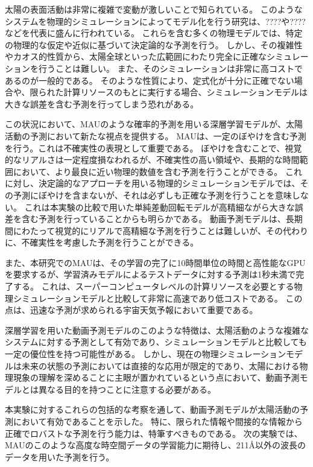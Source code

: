       太陽の表面活動は非常に複雑で変動が激しいことで知られている。
      このようなシステムを物理的シミュレーションによってモデル化を行う研究は、????や????などを代表に盛んに行われている。
      これらを含む多くの物理モデルでは、特定の物理的な仮定や近似に基づいて決定論的な予測を行う。
      しかし、その複雑性やカオス的性質から、太陽全球といった広範囲にわたり完全に正確なシミュレーションを行うことは難しい。
      また、そのシミュレーションは非常に高コストであるのが一般的である。
      そのような性質により、定式化が十分に正確でない場合や、限られた計算リソースのもとに実行する場合、シミュレーションモデルは大きな誤差を含む予測を行ってしまう恐れがある。

      この状況において、MAUのような確率的予測を用いる深層学習モデルが、太陽活動の予測において新たな視点を提供する。
      MAUは、一定のぼやけを含む予測を行う。これは不確実性の表現として重要である。
      ぼやけを含むことで、視覚的なリアルさは一定程度損なわれるが、不確実性の高い領域や、長期的な時間範囲において、より最良に近い物理的数値を含む予測を行うことができる。
      これに対し、決定論的なアプローチを用いる物理的シミュレーションモデルでは、その予測にぼやけを含まないが、それは必ずしも正確な予測を行うことを意味しない。
      これは本実験の比較で用いた単純差動回転モデルが高精細ながら大きな誤差を含む予測を行っていることからも明らかである。
      動画予測モデルは、長期間にわたって視覚的にリアルで高精細な予測を行うことは難しいが、その代わりに、不確実性を考慮した予測を行うことができる。
      
      また、本研究でのMAUは、その学習の完了に10時間単位の時間と高性能なGPUを要求するが、学習済みモデルによるテストデータに対する予測は1秒未満で完了する。
      これは、スーパーコンピュータレベルの計算リソースを必要とする物理シミュレーションモデルと比較して非常に高速であり低コストである。
      この点は、迅速な予測が求められる宇宙天気予報において重要である。

      深層学習を用いた動画予測モデルのこのような特徴は、太陽活動のような複雑なシステムに対する予測として有効であり、シミュレーションモデルと比較しても一定の優位性を持つ可能性がある。
      しかし、現在の物理シミュレーションモデルは未来の状態の予測においては直接的な応用が限定的であり、太陽における物理現象の理解を深めることに主眼が置かれているという点において、動画予測モデルとは異なる目的を持つことに注意する必要がある。
      
      本実験に対するこれらの包括的な考察を通して、動画予測モデルが太陽活動の予測において有効であることを示した。
      特に、限られた情報や間接的な情報から正確でロバストな予測を行う能力は、特筆すべきものである。
      次の実験では、MAUのこのような高度な時空間データの学習能力に期待し、211Å以外の波長のデータを用いた予測を行う。
      


